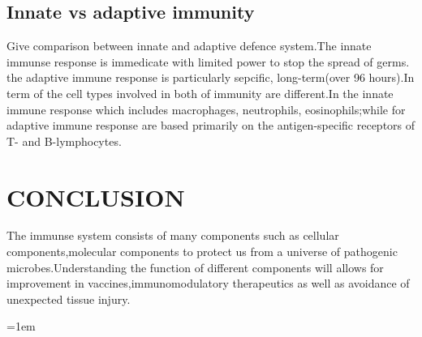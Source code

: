 \documentclass[12pt]{article}
\begin{document}
\subsection{Innate vs adaptive immunity}
Give comparison between innate and adaptive defence system.The innate immunse response is immedicate with limited power to stop the spread of germs. the adaptive immune response is particularly sepcific, long-term(over 96 hours).In term of the cell types involved in both of immunity are different.In the innate immune response which includes macrophages, neutrophils, eosinophils;while for adaptive immune response  are based primarily on the antigen-specific receptors of T- and B-lymphocytes.

\section{CONCLUSION}
The immunse system consists of many components such as cellular  components,molecular components to protect us from a universe of pathogenic microbes.Understanding the function of different components will allows for improvement in vaccines,immunomodulatory therapeutics as well as avoidance of unexpected tissue injury.


\emergencystretch=1em
\printbibliography[title=Reference]
\end{document}
